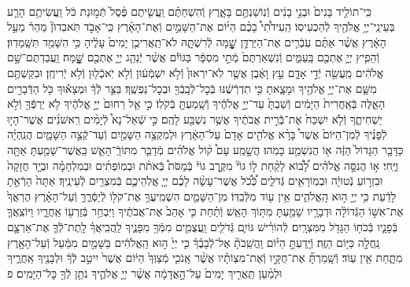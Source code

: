 \documentclass[twoside, openany, parskip=half, 11pt]{book}
\begin{document}
\begin{footnotesize}
\begin{multicols}{2}
\\
כִּֽי־תוֹלִ֤יד בָּנִים֙ וּבְנֵ֣י בָנִ֔ים וְֿנֽוֹשַׁנְתֶּ֖ם בָּאָ֑רֶץ וְֿהִשְׁחַתֶּ֗ם וַֽעֲשִׂ֤יתֶם פֶּ֨סֶל֙ תְּֿמ֣וּנַת כֹּ֔ל וַֽעֲשִׂיתֶ֥ם הָרַ֛ע בְּעֵינֵֽי־יְיָ֥ אֱלֹהֶ֖יךָ לְֿהַכְעִיסֽוֹ׃ הַֽעִידֹ֩תִי֩ בָכֶ֨ם הַיּ֜וֹם אֶת־הַשָּׁמַ֣יִם וְֿאֶת־הָאָ֗רֶץ כִּֽי־אָבֹ֣ד תֹּֽאבֵדוּן֘ מַהֵר֒ מֵעַ֣ל הָאָ֔רֶץ אֲשֶׁ֨ר אַתֶּ֜ם עֹֽבְֿרִ֧ים אֶת־הַיַּרְדֵּ֛ן שׇׇׇׇׇׇָׁ֖מָּה לְֿרִשְׁתָּ֑הּ לֹא־תַֽאֲרִיכֻ֤ן יָמִים֙ עָלֶ֔יהָ כִּ֥י הִשָּׁמֵ֖ד תִּשָּֽׁמֵדֽוּן׃ וְֿהֵפִ֧יץ יְיָ֛ אֶתְכֶ֖ם בָּֽעַמִּ֑ים וְֿנִשְׁאַרְתֶּם֙ מְֿתֵ֣י מִסְפָּ֔ר בַּגּוֹיִ֕ם אֲשֶׁ֨ר יְֿנַהֵ֧ג יְיָ֛ אֶתְכֶ֖ם שׇׇׇׇׇׇׇׇָֽׁמָּה׃ וַֽעֲבַדְתֶּם־שָׁ֣ם אֱלֹהִ֔ים מַֽעֲשֵׂ֖ה יְֿדֵ֣י אָדָ֑ם עֵ֣ץ וָאֶ֔בֶן אֲשֶׁ֤ר לֹֽא־יִרְאוּן֙ וְֿלֹ֣א יִשְׁמְֿע֔וּן וְֿלֹ֥א יֹֽאכְֿל֖וּן וְֿלֹ֥א יְֿרִיחֻֽן׃ וּבִקַּשְׁתֶּ֥ם מִשָּׁ֛ם אֶת־יְיָ֥ אֱלֹהֶ֖יךָ וּמָצָ֑אתָ כִּ֣י תִדְרְֿשֶׁ֔נּוּ בְּֿכׇל־לְֿבָֽבְֿךָ֖ וּבְכׇל־נַפְשֶֽׁךָ׃
בַּצַּ֣ר לְֿךָ֔ וּמְצָא֕וּךָ כֹּ֖ל הַדְּֿבָרִ֣ים הָאֵ֑לֶּה בְּֿאַֽחֲרִית֙ הַיָּמִ֔ים וְֿשַׁבְתָּ֙ עַד־יְיָ֣ אֱלֹהֶ֔יךָ וְֿשָֽׁמַעְתָּ֖ בְּֿקֹלֽוֹ׃ כִּ֣י אֵ֤ל רַחוּם֙ יְיָ֣ אֱלֹהֶ֔יךָ לֹ֥א יַרְפְּֿךָ֖ וְֿלֹ֣א יַשְׁחִיתֶ֑ךָ וְֿלֹ֤א יִשְׁכַּח֙ אֶת־בְּֿֿרִ֣ית אֲבֹתֶ֔יךָ אֲשֶׁ֥ר נִשְׁבַּ֖ע לָהֶֽם׃ כִּ֣י שְֿׁאַל־נָא֩ לְֿיָמִ֨ים רִֽאשֹׁנִ֜ים אֲשֶׁר־הָי֣וּ לְֿפָנֶ֗יךָ לְֿמִן־הַיּוֹם֙ אֲשֶׁר֩ בָּרָ֨א אֱלֹהִ֤ים אָדָם֙ עַל־הָאָ֔רֶץ וּלְמִקְצֵ֥ה הַשָּׁמַ֖יִם וְֿעַד־קְֿצֵ֣ה הַשָּׁמָ֑יִם הֲנִֽהְיָ֗ה כַּדָּבָ֤ר הַגָּדוֹל֙ הַזֶּ֔ה א֖וֹ הֲנִשְׁמַ֥ע כָּמֹֽהוּ׃ הֲשָׁ֣מַֽע עָם֩ ק֨וֹל אֱלֹהִ֜ים מְֿדַבֵּ֧ר מִתּוֹךְֿ־הָאֵ֛שׁ כַּֽאֲשֶׁר־שָׁמַ֥עְתָּ אַתָּ֖ה וַיֶּֽחִי׃ א֣וֹ הֲנִסָּ֣ה אֱלֹהִ֗ים לָ֠ב֠וֹא לָקַ֨חַת ל֣וֹ גּוֹי֘ מִקֶּ֣רֶב גּוֹי֒ בְּֿמַסֹּת֩ בְּֿאֹתֹ֨ת וּבְמֽוֹפְתִ֜ים וּבְמִלְחָמָ֗ה וּבְיָ֤ד חֲזָקָה֙ וּבִזְר֣וֹעַ נְֿטוּיָ֔ה וּבְמֽוֹרָאִ֖ים גְּֿדֹלִ֑ים כְּֿ֠כֹ֠ל אֲשֶׁר־עָשָׂ֨ה לָכֶ֜ם יְיָ֧ אֱלֹֽהֵיכֶ֛ם בְּֿמִצְרַ֖יִם לְֿעֵינֶֽיךָ׃ אַתָּה֙ הָרְֿאֵ֣תָ לָדַ֔עַת כִּ֥י יְיָ֖ ה֣וּא הָֽאֱלֹהִ֑ים אֵ֥ין ע֖וֹד מִלְּֿבַדּֽוֹ׃
מִן־הַשָּׁמַ֛יִם הִשְׁמִֽיעֲךָ֥ אֶת־קֹל֖וֹ לְֿיַסְּֿרֶ֑ךָּ וְֿעַל־הָאָ֗רֶץ הֶרְאֲךָ֙ אֶת־אִשּׁ֣וֹ הַגְּֿדוֹלָ֔ה וּדְבָרָ֥יו שָׁמַ֖עְתָּ מִתּ֥וֹךְ הָאֵֽשׁ׃ וְֿתַ֗חַת כִּ֤י אָהַב֙ אֶת־אֲבֹתֶ֔יךָ וַיִּבְחַ֥ר בְּֿזַרְע֖וֹ אַֽחֲרָ֑יו וַיּוֹצִֽאֲךָ֧ בְּֿפָנָ֛יו בְּֿכֹח֥וֹ הַגָּדֹ֖ל מִמִּצְרָֽיִם׃ לְֿהוֹרִ֗ישׁ גּוֹיִ֛ם גְּֿדֹלִ֧ים וַֽעֲצֻמִ֛ים מִמְּֿךָ֖ מִפָּנֶ֑יךָ לַֽהֲבִֽיאֲךָ֗ לָֽתֶת־לְֿךָ֧ אֶת־אַרְצָ֛ם נַֽחֲלָ֖ה כַּיּ֥וֹם הַזֶּֽה׃ וְֿיָֽדַעְתָּ֣ הַיּ֗וֹם וַֽהֲשֵֽׁבֹתָ֘ אֶל־לְֿבָבֶ֒ךָ֒ כִּ֤י יְיָ֙ ה֣וּא הָֽאֱלֹהִ֔ים בַּשָּׁמַ֣יִם מִמַּ֔עַל וְֿעַל־הָאָ֖רֶץ מִתָּ֑חַת אֵ֖ין עֽוֹד׃ וְֿשָֽׁמַרְתָּ֞ אֶת־חֻקָּ֣יו וְֿאֶת־מִצְוֹתָ֗יו אֲשֶׁ֨ר אָֽנֹכִ֤י מְֿצַוְּךָ֙ הַיּ֔וֹם אֲשֶׁר֙ יִיטַ֣ב לְֿךָ֔ וּלְבָנֶ֖יךָ אַֽחֲרֶ֑יךָ וּלְמַ֨עַן תַּֽאֲרִ֤יךְ יָמִים֙ עַל־הָ֣אֲדָמָ֔ה אֲשֶׁ֨ר יְיָ֤ אֱלֹהֶ֛יךָ נֹתֵ֥ן לְֿךָ֖ כׇּל־הַיָּמִֽים׃ פ


\end{multicols}
\end{footnotesize}
\end{document}
